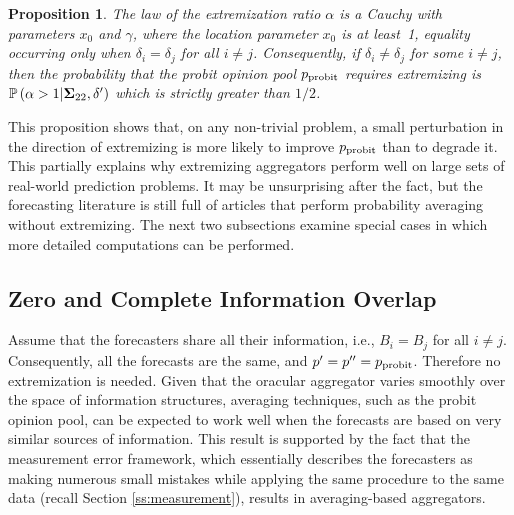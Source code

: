 \documentclass[12pt]{article}
\renewcommand{\P}{\mathbb{P}}
\newtheorem{proposition}[theorem]{Proposition}
\theoremstyle{definition}
\theoremstyle{definition}
\def\P{{\mathbb P}}
\def\probit{p_{\rm probit}}
\begin{document}
\begin{proposition}
\label{positiveProbThm}
The law of the extremization ratio $\alpha$ is a Cauchy with
parameters $x_0$ and $\gamma$, where the location parameter $x_0$ is
at least~1, equality occurring only when $\delta_i = \delta_j$ for all
$i \neq j$. Consequently, if $\delta_i \neq \delta_j$ for some
$i \neq j$, then the probability that the probit opinion pool $\probit$
requires extremizing is $\P\left(\alpha > 1 | {\bf\Sigma}_{22}, \delta'\right)$ which
is strictly greater than $1/2$.
\end{proposition}
\noindent
This proposition shows that, on any non-trivial problem, a small
perturbation in the direction of extremizing is more likely to improve
$\probit$ than to degrade it.  This partially explains
why extremizing aggregators perform well on large sets of real-world
prediction problems.  It may be unsurprising after the fact, but the
forecasting literature is still full of articles that perform
probability averaging without extremizing. The next two subsections examine special cases in which more detailed computations can be performed.


\subsection{Zero and Complete Information Overlap}
\label{disjoint}
Assume that the forecasters share all their information, i.e.,   $B_{i} = B_j$ for all $i \neq j$. Consequently, all the forecasts are the same, and $p' = p'' = \probit$.
Therefore no
extremization is needed. Given that the oracular aggregator varies
smoothly over the space of information structures, averaging
techniques, such as the probit opinion pool, can be expected to work
well when the forecasts are based on very similar sources of
information. This result is supported by the fact that the
measurement error framework, which essentially describes the
forecasters as making numerous small mistakes while applying the same
procedure to the same data (recall Section \ref{ss:measurement}),
results in averaging-based aggregators.
\end{document}
